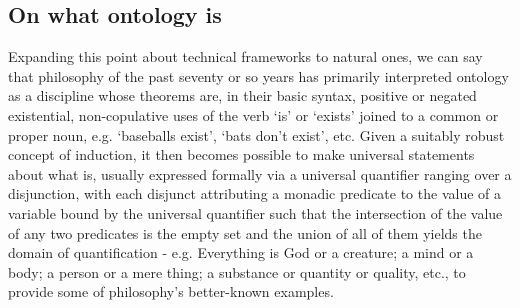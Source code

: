 \documentclass[]{article}
\begin{document}
\subsection{On what ontology is}
Expanding this point about technical frameworks to natural ones,
we can say that 
philosophy of the past seventy or so years has primarily interpreted ontology 
as a discipline whose theorems are, 
in their basic syntax, 
positive or negated existential, non-copulative uses of the verb `is' or `exists' joined to a common or proper noun, 
e.g. `baseballs exist', `bats don't exist', etc. 
Given a suitably robust concept of induction, it then becomes possible to make universal statements about what is, 
usually expressed formally via a universal quantifier ranging over a disjunction, 
with each disjunct
attributing a monadic predicate to the value of a variable bound by the universal quantifier 
such that 
the intersection of the value of any two predicates is the empty set 
and the union of all of them
yields the domain of quantification - 
e.g. Everything is God or a creature; 
a mind or a body; 
a person or a mere thing; 
a substance or quantity or quality, etc., 
to provide some of philosophy's better-known examples. 
\end{document}
